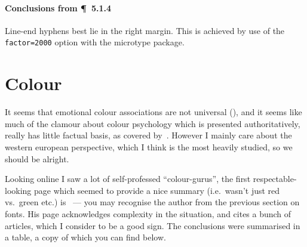 \documentclass[solid,math,chem,code,plot,gloss]{bmc}
\begin{document}
\paragraph{Conclusions from \P~5.1.4}
Line-end hyphens best lie in the right margin. This is achieved by use of the
\texttt{factor=2000} option with the microtype package.

\section{Colour}

It seems that emotional colour associations are not universal (\cite{Laurence1991}),
and it seems like much of the clamour about colour psychology which is presented
authoritatively, really has little factual basis, as covered by~\cite{OConnnor2011}.
However I mainly care about the western european perspective, which I think is
the most heavily studied, so we should be alright.

Looking online I saw a lot of self-professed ``colour-gurus'', the first
respectable-looking page which seemed to provide a nice summary
(i.e.\ wasn't just red vs.\ green etc.) is~\cite{web_colour} — you may recognise the
author from the previous section on fonts.
His page acknowledges complexity in the situation, and cites a bunch of articles,
which I consider to be a good sign.
The conclusions were summarised in a table, a copy of which you can find below.
\end{document}
